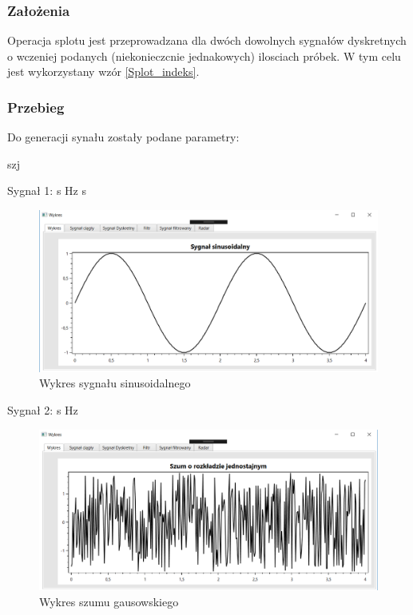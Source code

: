 \documentclass[12pt]{article}
\begin{document}
\subsubsection{Założenia}
Operacja splotu jest przeprowadzana dla dwóch dowolnych sygnałów dyskretnych o wczeniej podanych (niekonieczcnie jednakowych) ilosciach próbek. W tym celu jest wykorzystany wzór \ref{Splot_indeks}.

\subsubsection{Przebieg}
Do generacji synału zostały podane parametry:

\begin{labeling}{szj}
\item [Sygnał 1:]
 s
 Hz
 s

\begin{figure}[h!]
 \centering
 \includegraphics[width=12.3cm]{sin.PNG}
 \vspace{-0.3cm}
 \caption{Wykres sygnału sinusoidalnego}
 \label{sin}
\end{figure}

\item [Sygnał 2:]
 s
 Hz

\end{labeling}

\begin{figure}[h!]
 \centering
 \includegraphics[width=12.3cm]{szum.PNG}
 \vspace{-0.3cm}
 \caption{Wykres szumu gausowskiego}
 \label{szum}
\end{figure}
 \newpage
\end{document}

